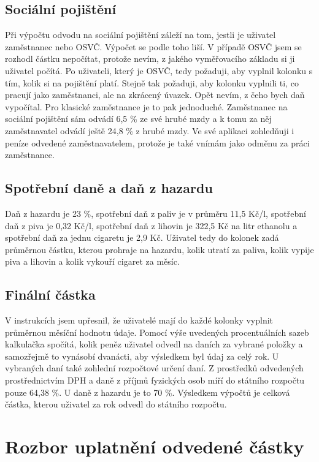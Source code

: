 \documentclass[11pt,a4paper,twoside,openright]{report}
\begin{document}
\subsection{Sociální pojištění}

Při výpočtu odvodu na sociální pojištění záleží na tom, jestli je uživatel zaměstnanec nebo OSVČ.
Výpočet se podle toho liší. V případě OSVČ jsem se rozhodl částku nepočítat, protože nevím, z
jakého vyměřovacího základu si ji uživatel počítá. Po uživateli, který je OSVČ, tedy
požaduji, aby vyplnil kolonku s tím, kolik si na pojištění platí. Stejně tak požaduji, aby
kolonku vyplnili ti, co pracují jako zaměstnanci, ale na zkrácený úvazek. Opět nevím, z čeho
bych daň vypočítal. Pro klasické zaměstnance je to pak jednoduché. Zaměstnanec  na sociální
pojištění sám odvádí 6,5 \% ze své hrubé mzdy a k tomu za něj zaměstnavatel odvádí ještě
24,8 \% z hrubé mzdy. Ve své aplikaci zohledňuji i peníze odvedené zaměstnavatelem, protože
je také vnímám jako odměnu za práci zaměstnance.

\subsection{Spotřební daně a daň z hazardu}

Daň z hazardu je 23 \%, spotřební daň z paliv je v průměru 11,5 Kč/l, spotřební daň z piva je 0,32 Kč/l, spotřební daň z lihovin je 322,5 Kč na litr ethanolu a spotřební daň za jednu cigaretu je 2,9 Kč. Uživatel tedy do kolonek zadá průměrnou částku, kterou prohraje na hazardu, kolik utratí za paliva, kolik vypije piva a lihovin a kolik vykouří cigaret za měsíc.

\subsection{Finální částka}

V instrukcích jsem upřesnil, že uživatelé mají do každé kolonky vyplnit průměrnou měsíční hodnotu údaje.
Pomocí výše uvedených procentuálních sazeb kalkulačka spočítá, kolik peněz uživatel odvedl na
daních za vybrané položky a samozřejmě to vynásobí dvanácti, aby výsledkem byl údaj za celý rok.
U vybraných daní také zohlední rozpočtové určení daní. Z prostředků odvedených prostřednictvím
DPH a daně z příjmů fyzických osob míří do státního rozpočtu pouze 64,38 \%. U daně z hazardu
je to 70 \%. Výsledkem výpočtů je celková částka, kterou uživatel za rok odvedl do státního rozpočtu.

\section{Rozbor uplatnění odvedené částky}
\end{document}
